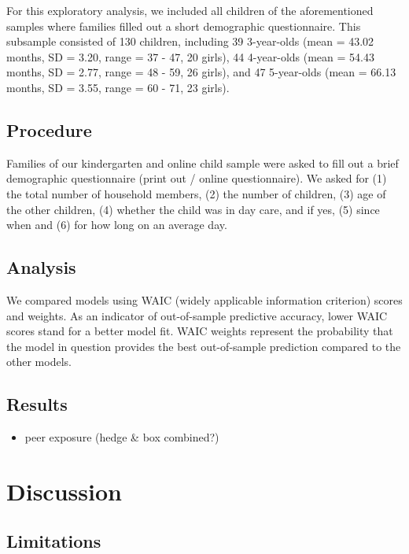 \documentclass[
  man,floatsintext]{apa6}
\providecommand{\tightlist}{%
  \setlength{\itemsep}{0pt}\setlength{\parskip}{0pt}}
\begin{document}
For this exploratory analysis, we included all children of the aforementioned samples where families filled out a short demographic questionnaire. This subsample consisted of
130 children, including
39 3-year-olds
(mean = 43.02 months,
SD = 3.20,
range = 37
- 47,
20 girls),
44 4-year-olds
(mean = 54.43 months,
SD = 2.77,
range = 48
- 59,
26 girls),
and 47 5-year-olds
(mean = 66.13 months,
SD = 3.55,
range = 60
- 71,
23 girls).

\hypertarget{procedure-2}{%
\subsection{Procedure}\label{procedure-2}}

Families of our kindergarten and online child sample were asked to fill out a brief demographic questionnaire (print out / online questionnaire). We asked for (1) the total number of household members, (2) the number of children, (3) age of the other children, (4) whether the child was in day care, and if yes, (5) since when and (6) for how long on an average day.

\hypertarget{analysis-2}{%
\subsection{Analysis}\label{analysis-2}}

We compared models using WAIC (widely applicable information criterion) scores and weights. As an indicator of out-of-sample predictive accuracy, lower WAIC scores stand for a better model fit. WAIC weights represent the probability that the model in question provides the best out-of-sample prediction compared to the other models.

\hypertarget{results-2}{%
\subsection{Results}\label{results-2}}

\begin{itemize}
\tightlist
\item
  peer exposure (hedge \& box combined?)
\end{itemize}

\hypertarget{discussion-2}{%
\section{Discussion}\label{discussion-2}}

\hypertarget{limitations}{%
\subsection{Limitations}\label{limitations}}
\end{document}
